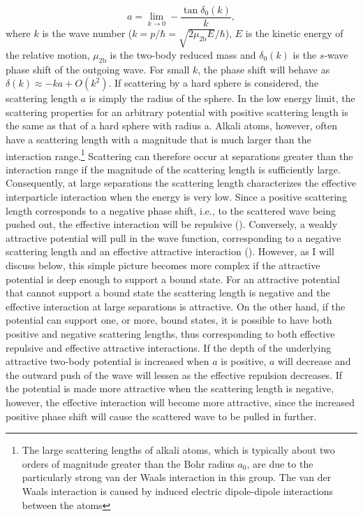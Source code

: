 \begin{equation} \label{eq:2}
a = \lim_{k \to 0} -\frac{\tan\delta_0(k)}{k},
\end{equation}
where $k$ is the wave number ($k=p/\hbar = \sqrt{2\mu_{2\mathrm{b}} E}/\hbar$), $E$ is the kinetic energy of the relative motion, $\mu_{2\mathrm{b}}$ is the two-body reduced mass and $\delta_0(k)$ is the $s$-wave phase shift of the outgoing wave. For small $k$, the phase shift will behave as $\delta(k)\approx-ka + O(k^2)$. If scattering by a hard sphere is considered, the scattering length $a$ is simply the radius of the sphere. In the low energy limit, the scattering properties for an arbitrary potential with positive scattering length is the same as that of a hard sphere with radius a. Alkali atoms, however, often have a scattering length with a magnitude that is much larger than the interaction range.\footnote{The large scattering lengths of alkali atoms, which is typically about two orders of magnitude greater than the Bohr radius $a_0$, are due to the particularly strong van der Waals interaction in this group. The van der Waals interaction is caused by induced electric dipole-dipole interactions between the atoms  } Scattering can therefore occur at separations greater than the interaction range if the magnitude of the scattering length is sufficiently large. Consequently, at large separations the scattering length characterizes the effective interparticle interaction when the energy is very low. Since a positive scattering length corresponds to a negative phase shift, i.e., to the scattered wave being pushed out, the effective interaction will be repulsive (). Conversely, a weakly attractive potential will pull in the wave function, corresponding to a negative scattering length and an effective attractive interaction (). However, as I will discuss below, this simple picture becomes more complex if the attractive potential is deep enough to support a bound state. For an attractive potential that cannot support a bound state the scattering length is negative and the effective interaction at large separations is attractive. On the other hand, if the potential can support one, or more, bound states, it is possible to have both positive and negative scattering lengths, thus corresponding to both effective repulsive and effective attractive interactions. If the depth of the underlying attractive two-body potential is increased when $a$ is positive, $a$ will decrease and the outward push of the wave will lessen as the effective repulsion decreases. If the potential is made more attractive when the scattering length is negative, however, the effective interaction will become more attractive, since the increased positive phase shift will cause the scattered wave to be pulled in further. 

